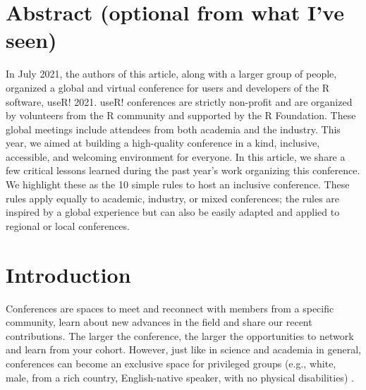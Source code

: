 \documentclass[10pt,letterpaper]{article}
\begin{document}
\section*{Abstract (optional from what I've seen)}

In July 2021, the authors of this article, along with a larger group of people, organized a global and virtual conference for users and developers of the R software, useR! 2021. useR! conferences are strictly non-profit and are organized by volunteers from the R community and supported by the R Foundation. These global meetings include attendees from both academia and the industry. This year, we aimed at building a high-quality conference in a kind, inclusive, accessible, and welcoming environment for everyone. In this article, we share a few critical lessons learned during the past year's work organizing this conference. We highlight these as the 10 simple rules to host an inclusive conference. These rules apply equally to academic, industry, or mixed conferences; the rules are inspired by a global experience but can also be easily adapted and applied to regional or local conferences.



\linenumbers

\section*{Introduction}

Conferences are spaces to meet and reconnect with members from a specific community, learn about new advances in the field and share our recent contributions. The larger the conference, the larger the opportunities to network and learn from your cohort. However, just like in science and academia in general, conferences can become an exclusive space for privileged groups (e.g., white, male, from a rich country, English-native speaker, with no physical disabilities)  \cite{arend_disparity_2019, timperley_he_2020, gewin_what_2019, brown_ableism_2018}.
\end{document}
